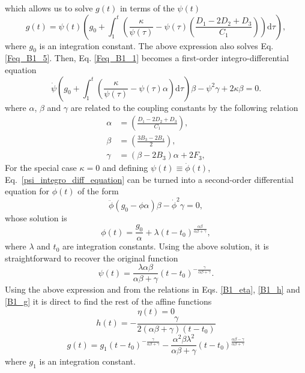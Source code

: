 \documentclass[epj]{svjour}
\begin{document}
which allows us to solve $g(t)$ in terms of the $\psi(t)$ 
\begin{equation}
    \label{B1_g}
    g(t) = \psi(t) \left(g_0 + \int_1^t \left(\frac{\kappa}{\psi(\tau)} - \psi(\tau) \left(\frac{D_1 - 2D_2 + D_3}{C_1}\right)\right) \mathrm{d}\tau\right),
\end{equation}
where $g_0$ is an integration constant. The above expression also solves Eq. \eqref{Feq_B1_5}. Then, Eq. \eqref{Feq_B1_1} becomes a first-order integro-differential equation 
\begin{dmath}
    \label{psi_integro_diff_equation}
    \dot{\psi}\left(g_0 + \int_1^t \left(\frac{\kappa}{\psi(\tau)} - \psi(\tau) \alpha\right) \mathrm{d}\tau\right)\beta -
    \psi^2 \gamma + 2\kappa\beta = 0.
\end{dmath}
where $\alpha$, $\beta$ and $\gamma$ are related to the coupling constants
by the following relation
\begin{align}
    \alpha & = \left(\frac{D_1 - 2D_2 + D_3}{C_1}\right), \\
    \beta & = \left(\frac{3B_3 - 2B_4}{2}\right), \\
    \gamma & = \left(\beta - 2B_3\right)\alpha + 2F_3,
\end{align}
For the special case $\kappa = 0$ and defining $\psi (t) \equiv \dot{\phi}(t)$, Eq.~\eqref{psi_integro_diff_equation} can be turned into a second-order differential equation for $\phi(t)$ of the form
\begin{dmath}
\label{diff_eq_phi}
    \ddot{\phi}\left(g_0  - \phi\alpha\right)\beta - \dot{\phi}^2 \gamma  = 0,
\end{dmath}
whose solution is
\begin{equation}
    \label{phi_general}
    \phi(t) =\frac{g_0}{\alpha} + \lambda\left(t -t_0\right)^{\frac{\alpha\beta}{\alpha\beta + \gamma}},
\end{equation}
where $\lambda $ and $t_0$ are integration constants. Using the above solution, it is straightforward to recover the original function
\begin{equation}
    \psi(t) =\frac{ \lambda\alpha\beta}{\alpha\beta + \gamma}\left(t -t_0\right)^{-\frac{\gamma}{\alpha\beta + \gamma}}.
\end{equation}
Using the above expression and from the relations in Eqs. \eqref{B1_eta}, \eqref{B1_h} and \eqref{B1_g} it is direct to find the rest of the
affine functions
\begin{dmath}
\eta(t)  = 0
\end{dmath}
\begin{dmath}
h(t) =  -\frac{\gamma}{2\left(\alpha\beta + \gamma\right)\left(t - t_0\right)}
\end{dmath}
\begin{dmath}
g(t) =g_1\left(t - t_0\right)^{-\frac{\gamma}{\alpha\beta + \gamma}}
-\frac{\alpha^2\beta\lambda^2 }{\alpha\beta + \gamma}\left(t - t_0\right)^{\frac{\alpha\beta-\gamma}{\alpha\beta + \gamma}}\end{dmath}
where $g_1$ is an integration constant.
\end{document}
